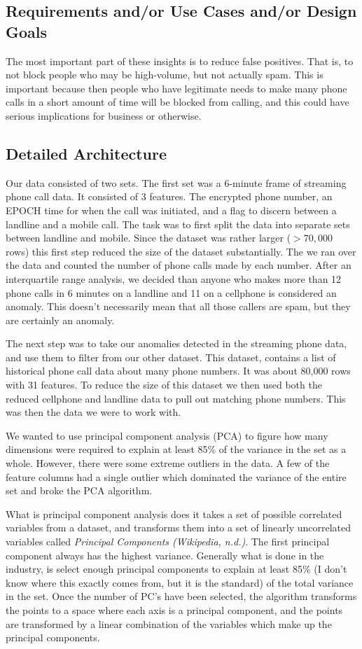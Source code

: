 \documentclass[20pt]{article} %
\begin{document}
\subsection{Requirements and/or Use Cases and/or Design Goals}
The most important part of these insights is to reduce false positives.  That is, to not block people who may be high-volume, but not actually spam.  This is important because then people who have legitimate needs to make many phone calls in a short amount of time will be blocked from calling, and this could have serious implications for business or otherwise.
\subsection{Detailed Architecture}
Our data consisted of two sets.  The first set was a 6-minute frame of streaming phone call data.  It consisted of 3 features.  The encrypted phone number, an EPOCH time for when the call was initiated, and a flag to discern between a landline and a mobile call.  The task was to first split the data into separate sets between landline and mobile.  Since the dataset was rather larger ($>70,000$ rows) this first step reduced the size of the dataset substantially.  The we ran over the data and counted the number of phone calls made by each number.  After an interquartile range analysis, we decided than anyone who makes more than 12 phone calls in 6 minutes on a landline and 11 on a cellphone is considered an anomaly.  This doesn’t necessarily mean that all those callers are spam, but they are certainly an anomaly.  

The next step was to take our anomalies detected in the streaming phone data, and use them to filter from our other dataset.  This dataset, contains a list of historical phone call data about many phone numbers.  It was about 80,000 rows with 31 features.  To reduce the size of this dataset we then used both the reduced cellphone and landline data to pull out matching phone numbers.  This was then the data we were to work with.  

We wanted to use principal component analysis (PCA) to figure how many dimensions were required to explain at least 85\% of the variance in the set as a whole.  However, there were some extreme outliers in the data.  A few of the feature columns had a single outlier which dominated the variance of the entire set and broke the PCA algorithm. 

What is principal component analysis does it takes a set of possible correlated variables from a dataset, and transforms them into a set of linearly uncorrelated variables called \textit{Principal Components (Wikipedia, n.d.)}.  The first principal component always has the highest variance.  Generally what is done in the industry, is select enough principal components to explain at least 85\% (I don't know where this exactly comes from, but it is the standard) of the total variance in the set. Once the number of PC's have been selected, the algorithm transforms the points to a space where each axis is a principal component, and the points are transformed by a linear combination of the variables which make up the principal components.
\end{document}
